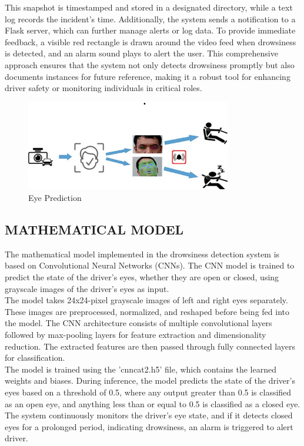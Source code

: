 \documentclass[12pt]{article}
\begin{document}
This snapshot is timestamped and stored in a designated directory, while a text log records the incident's time. Additionally, the system sends a notification to a Flask server, which can further manage alerts or log data. To provide immediate feedback, a visible red rectangle is drawn around the video feed when drowsiness is detected, and an alarm sound plays to alert the user. This comprehensive approach ensures that the system not only detects drowsiness promptly but also documents instances for future reference, making it a robust tool for enhancing driver safety or monitoring individuals in critical roles.
\begin{figure}[h]
\centering
\includegraphics[width=0.8\textwidth]{EP}
\caption{Eye Prediction}
\end{figure}
\FloatBarrier

\subsection{MATHEMATICAL MODEL}
The mathematical model implemented in the drowsiness detection system is based on Convolutional Neural Networks (CNNs). The CNN model is trained to predict the state of the driver's eyes, whether they are open or closed, using grayscale images of the driver's eyes as input.\\
The model takes 24x24-pixel grayscale images of  left and right eyes separately. These images are preprocessed, normalized, and reshaped before being fed into the model. The CNN architecture consists of multiple convolutional layers followed by max-pooling layers for feature extraction and dimensionality reduction. The extracted features are then passed through fully connected layers for classification. \\

The model is trained using the 'cnncat2.h5' file, which contains the learned weights and biases. During inference, the model predicts the state of the driver's eyes based on a threshold of 0.5, where any output greater than 0.5 is classified as an open eye, and anything less than or equal to 0.5 is classified as a closed eye. The system continuously monitors the driver's eye state, and if it detects closed eyes for a prolonged period, indicating drowsiness, an alarm is triggered to alert driver.
\end{document}
